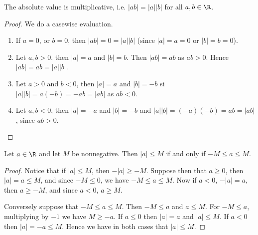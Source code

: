 \begin{remark}
  The absolute value is multiplicative, i.e. $|ab|=|a||b|$ for all $a,b \in \R$.
\end{remark}
\begin{proof}
  We do a casewise evaluation.
    \begin{enumerate}[label=(\arabic*)]
      \item If $a=0$, or $b=0$, then $|ab|=0=|a||b|$ (since $|a|=a=0$ or $|b|=b=0$).

      \item Let $a,b >0$. then $|a|=a$ and $|b|=b$. Then $|ab|=ab$ as $ab>0$. Hence $|ab|=ab=|a||b|$.

      \item Let $a>0$ and $b<0$, then $|a|=a$ and $|b|=-b$ si $|a||b|=a(-b)=-ab=|ab|$ as $ab<0$.

      \item Let $a,b<0$, then $|a|=-a$ and $|b|=-b$ and $|a||b|=(-a)(-b)=ab=|ab|$, since $ab>0$.
    \end{enumerate}
\end{proof}

\begin{theorem}
  Let $a \in \R$ and let $M$ be nonnegative. Then $|a| \leq M$ if and only if $-M \leq a \leq M$.
\end{theorem}
\begin{proof}
  Notice that if $|a| \leq M$, then $-|a| \geq -M$. Suppose then that $a \geq 0$, then $|a|=a \leq M$, and since $-M \leq 0$, 
  we have $-M \leq a \leq M$.
  Now if $a<0$, $-|a|=a$, then $a \geq -M$, and since $a<0$, $a \geq M$.

  Conversely suppose that $-M \leq a \leq M$. Then $-M \leq a$ and $a \leq M$. For $-M \leq a$, multiplying by $-1$ we have 
  $M \geq -a$. If $a \leq 0$ then $|a|=a$ and $|a| \leq M$. If $a<0$ then $|a|=-a \leq M$. Hence we have in both cases that $|a| \leq M$.
\end{proof}

